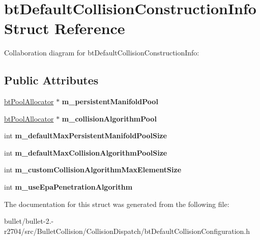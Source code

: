 \hypertarget{structbt_default_collision_construction_info}{\section{bt\+Default\+Collision\+Construction\+Info Struct Reference}
\label{structbt_default_collision_construction_info}
}


Collaboration diagram for bt\+Default\+Collision\+Construction\+Info\+:
\subsection*{Public Attributes}
\begin{DoxyCompactItemize}
\item 
\hypertarget{structbt_default_collision_construction_info_aab9e77323efc422ce3b9e764b4ca1909}{\hyperlink{classbt_pool_allocator}{bt\+Pool\+Allocator} $\ast$ {\bfseries m\+\_\+persistent\+Manifold\+Pool}}\label{structbt_default_collision_construction_info_aab9e77323efc422ce3b9e764b4ca1909}

\item 
\hypertarget{structbt_default_collision_construction_info_a82ac5be68984263f95f86f05922146e8}{\hyperlink{classbt_pool_allocator}{bt\+Pool\+Allocator} $\ast$ {\bfseries m\+\_\+collision\+Algorithm\+Pool}}\label{structbt_default_collision_construction_info_a82ac5be68984263f95f86f05922146e8}

\item 
\hypertarget{structbt_default_collision_construction_info_aa360b883562dfa18695939f8832eb5f3}{int {\bfseries m\+\_\+default\+Max\+Persistent\+Manifold\+Pool\+Size}}\label{structbt_default_collision_construction_info_aa360b883562dfa18695939f8832eb5f3}

\item 
\hypertarget{structbt_default_collision_construction_info_aa1db1dc0bf03dffb8b0b152b6d96077e}{int {\bfseries m\+\_\+default\+Max\+Collision\+Algorithm\+Pool\+Size}}\label{structbt_default_collision_construction_info_aa1db1dc0bf03dffb8b0b152b6d96077e}

\item 
\hypertarget{structbt_default_collision_construction_info_aac52955ec7c669bf09256360f8133935}{int {\bfseries m\+\_\+custom\+Collision\+Algorithm\+Max\+Element\+Size}}\label{structbt_default_collision_construction_info_aac52955ec7c669bf09256360f8133935}

\item 
\hypertarget{structbt_default_collision_construction_info_afb2823015e0637b29493c7f999bf54ff}{int {\bfseries m\+\_\+use\+Epa\+Penetration\+Algorithm}}\label{structbt_default_collision_construction_info_afb2823015e0637b29493c7f999bf54ff}

\end{DoxyCompactItemize}


The documentation for this struct was generated from the following file\+:\begin{DoxyCompactItemize}
\item 
bullet/bullet-\/2.-\/r2704/src/\+Bullet\+Collision/\+Collision\+Dispatch/bt\+Default\+Collision\+Configuration.\+h\end{DoxyCompactItemize}
